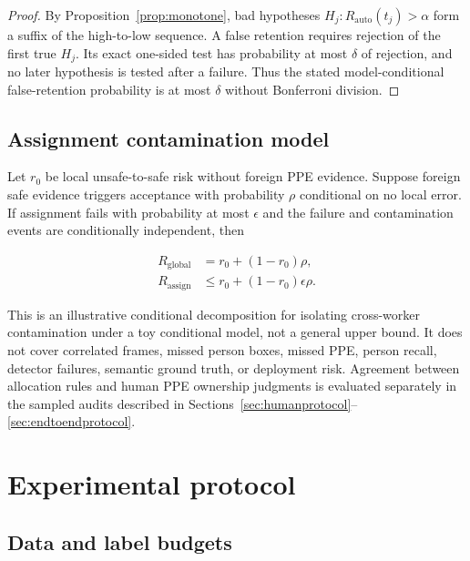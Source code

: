 \documentclass[iicol,pdflatex,sn-mathphys-num]{sn-jnl}
\begin{document}
\begin{proof}
By Proposition~\ref{prop:monotone}, bad hypotheses $H_j:R_{\mathrm{auto}}(t_j)>\alpha$ form a suffix of the high-to-low sequence. A false retention requires rejection of the first true $H_j$. Its exact one-sided test has probability at most $\delta$ of rejection, and no later hypothesis is tested after a failure. Thus the stated model-conditional false-retention probability is at most $\delta$ without Bonferroni division.
\end{proof}

\subsection{Assignment contamination model}

Let $r_0$ be local unsafe-to-safe risk without foreign PPE evidence. Suppose foreign safe evidence triggers acceptance with probability $\rho$ conditional on no local error. If assignment fails with probability at most $\epsilon$ and the failure and contamination events are conditionally independent, then

\begin{equation}
\begin{aligned}
R_{\mathrm{global}}&=r_0+(1-r_0)\rho,\\
R_{\mathrm{assign}}&\leq r_0+(1-r_0)\epsilon\rho.
\end{aligned}
\label{eq:contamination}
\end{equation}

This is an illustrative conditional decomposition for isolating cross-worker contamination under a toy conditional model, not a general upper bound. It does not cover correlated frames, missed person boxes, missed PPE, person recall, detector failures, semantic ground truth, or deployment risk. Agreement between allocation rules and human PPE ownership judgments is evaluated separately in the sampled audits described in Sections~\ref{sec:humanprotocol}--\ref{sec:endtoendprotocol}.

\section{Experimental protocol}\label{sec:experiments}

\subsection{Data and label budgets}
\end{document}
